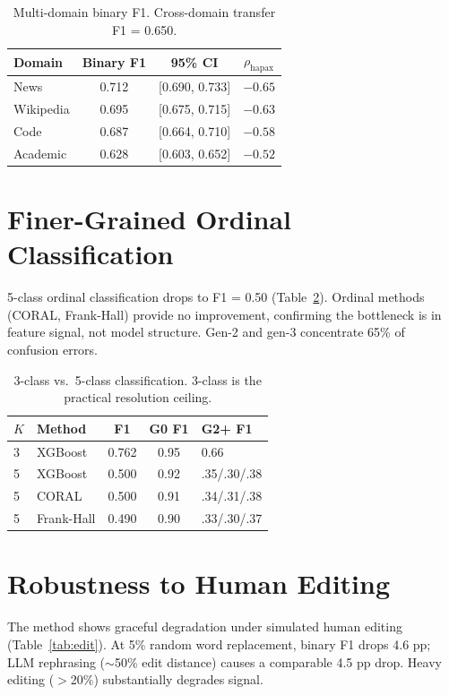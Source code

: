 \documentclass[11pt,a4paper]{article}
\begin{document}
\begin{table}[h]
\centering
\small
\begin{tabular}{lccc}
\toprule
\textbf{Domain} & \textbf{Binary F1} & \textbf{95\% CI} & \textbf{$\rho_\text{hapax}$} \\
\midrule
News & 0.712 & [0.690, 0.733] & $-0.65$ \\
Wikipedia & 0.695 & [0.675, 0.715] & $-0.63$ \\
Code & 0.687 & [0.664, 0.710] & $-0.58$ \\
Academic & 0.628 & [0.603, 0.652] & $-0.52$ \\
\bottomrule
\end{tabular}
\caption{Multi-domain binary F1. Cross-domain transfer F1 = 0.650.}
\label{tab:domain}
\end{table}

\section{Finer-Grained Ordinal Classification}
\label{app:ordinal}

5-class ordinal classification drops to F1 = 0.50 (Table~\ref{tab:ordinal}).
Ordinal methods (CORAL, Frank-Hall) provide no improvement, confirming the bottleneck is in feature signal, not model structure.
Gen-2 and gen-3 concentrate 65\% of confusion errors.

\begin{table}[h]
\centering
\small
\begin{tabular}{llccl}
\toprule
\textbf{$K$} & \textbf{Method} & \textbf{F1} & \textbf{G0 F1} & \textbf{G2+ F1} \\
\midrule
3 & XGBoost & 0.762 & 0.95 & 0.66 \\
5 & XGBoost & 0.500 & 0.92 & .35/.30/.38 \\
5 & CORAL & 0.500 & 0.91 & .34/.31/.38 \\
5 & Frank-Hall & 0.490 & 0.90 & .33/.30/.37 \\
\bottomrule
\end{tabular}
\caption{3-class vs.\ 5-class classification. 3-class is the practical resolution ceiling.}
\label{tab:ordinal}
\end{table}

\section{Robustness to Human Editing}
\label{app:edit}

The method shows graceful degradation under simulated human editing (Table~\ref{tab:edit}).
At 5\% random word replacement, binary F1 drops 4.6 pp; LLM rephrasing ($\sim$50\% edit distance) causes a comparable 4.5 pp drop.
Heavy editing ($>$20\%) substantially degrades signal.
\end{document}
